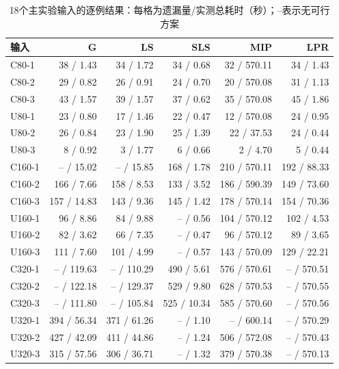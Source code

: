 \begin{table}[htbp]
\centering\footnotesize
\caption{18个主实验输入的逐例结果：每格为遗漏量/实测总耗时（秒）；--表示无可行方案}\label{tab:all-results}
\begin{tabular}{lrrrrr}\toprule
输入 & G & LS & SLS & MIP & LPR \\\midrule
C80-1 & 38 / 1.43 & 34 / 1.72 & 34 / 0.68 & 32 / 570.11 & 34 / 1.43 \\
C80-2 & 29 / 0.82 & 26 / 0.91 & 24 / 0.70 & 20 / 570.08 & 31 / 1.13 \\
C80-3 & 43 / 1.57 & 39 / 1.57 & 37 / 0.62 & 35 / 570.08 & 45 / 1.86 \\
U80-1 & 23 / 0.80 & 17 / 1.46 & 22 / 0.47 & 12 / 570.08 & 24 / 0.95 \\
U80-2 & 26 / 0.84 & 23 / 1.90 & 25 / 1.39 & 22 / 37.53 & 24 / 0.44 \\
U80-3 & 8 / 0.92 & 3 / 1.77 & 6 / 0.66 & 2 / 4.70 & 5 / 0.44 \\
C160-1 & -- / 15.02 & -- / 15.85 & 168 / 1.78 & 210 / 570.11 & 192 / 88.33 \\
C160-2 & 166 / 7.66 & 158 / 8.53 & 133 / 3.52 & 186 / 590.39 & 149 / 73.60 \\
C160-3 & 157 / 14.83 & 143 / 9.36 & 145 / 1.42 & 178 / 570.14 & 154 / 70.36 \\
U160-1 & 96 / 8.86 & 84 / 9.88 & -- / 0.56 & 104 / 570.12 & 102 / 4.53 \\
U160-2 & 82 / 3.62 & 66 / 7.35 & -- / 0.47 & 96 / 570.12 & 89 / 3.65 \\
U160-3 & 111 / 7.60 & 101 / 4.99 & -- / 0.57 & 143 / 570.09 & 129 / 22.21 \\
C320-1 & -- / 119.63 & -- / 110.29 & 490 / 5.61 & 576 / 570.61 & -- / 570.51 \\
C320-2 & -- / 122.18 & -- / 129.37 & 529 / 9.80 & 628 / 570.53 & -- / 570.55 \\
C320-3 & -- / 111.80 & -- / 105.84 & 525 / 10.34 & 585 / 570.60 & -- / 570.56 \\
U320-1 & 394 / 56.34 & 371 / 61.26 & -- / 1.10 & -- / 600.14 & -- / 570.29 \\
U320-2 & 427 / 42.09 & 411 / 44.86 & -- / 1.24 & 506 / 572.08 & -- / 570.43 \\
U320-3 & 315 / 57.56 & 306 / 36.71 & -- / 1.32 & 379 / 570.38 & -- / 570.13 \\
\bottomrule\end{tabular}
\end{table}
